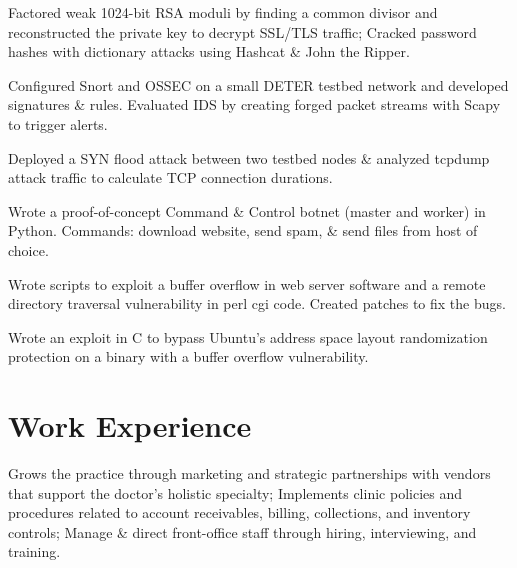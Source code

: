 \documentclass[10pt,letterpaper]{clar-resume}
\begin{document}
\begin{minipage}[t]{0.66\textwidth}
\begin{labwork}
\item[\lab{Cryptography Labs:}] 
Factored weak 1024-bit RSA moduli by finding a common divisor and reconstructed the private key to decrypt SSL/TLS traffic; Cracked password hashes with dictionary attacks using Hashcat \& John the Ripper.\\[1pt] 
\item[\lab{Intrusion Detection Systems Lab:}] Configured Snort and OSSEC on a small DETER testbed network and developed signatures \& rules.  Evaluated IDS by creating forged packet streams with Scapy to trigger alerts.\\[1pt]
\item[\lab{Denial of Service Lab:}] Deployed a SYN flood attack between two testbed nodes \& analyzed tcpdump attack traffic to calculate TCP connection durations.\\[1pt] 
\item[\lab{Malware Lab:}] Wrote a proof-of-concept Command \& Control botnet (master and worker) in Python.  Commands: download website, send spam, \& send files from host of choice.\\[1pt] 
\item[\lab{Exploits Lab:}] Wrote scripts to exploit a buffer overflow in web server software and a remote directory traversal vulnerability in perl cgi code.  Created patches to fix the bugs.\\[1pt] 
\item[\lab{OS-Specific security Lab:}] Wrote an exploit in C to bypass Ubuntu's address space layout randomization protection on a binary with a buffer overflow vulnerability.
\end{labwork}

\smallspace %


\section{Work Experience}

 \hfill
{}
Grows the practice through marketing and strategic partnerships with vendors that support the doctor’s holistic specialty; Implements clinic policies and procedures related to account receivables, billing, collections, and inventory controls; Manage \& direct front-office staff through hiring, interviewing, and training.


\end{minipage}
\end{document}
